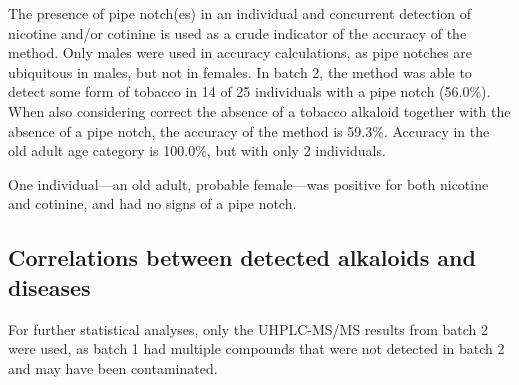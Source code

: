 \documentclass[
]{article}
\begin{document}
The presence of pipe notch(es) in an individual and concurrent detection
of nicotine and/or cotinine is used as a crude indicator of the accuracy
of the method. Only males were used in accuracy calculations, as pipe
notches are ubiquitous in males, but not in females. In batch 2, the
method was able to detect some form of tobacco in 14 of 25 individuals
with a pipe notch (56.0\%). When also considering correct the absence of
a tobacco alkaloid together with the absence of a pipe notch, the
accuracy of the method is 59.3\%. Accuracy in the old adult age category
is 100.0\%, but with only 2 individuals.

One individual---an old adult, probable female---was positive for both
nicotine and cotinine, and had no signs of a pipe notch.

\hypertarget{correlations-between-detected-alkaloids-and-diseases}{%
\subsection{Correlations between detected alkaloids and
diseases}\label{correlations-between-detected-alkaloids-and-diseases}}

For further statistical analyses, only the UHPLC-MS/MS results from
batch 2 were used, as batch 1 had multiple compounds that were not
detected in batch 2 and may have been contaminated.
\end{document}
